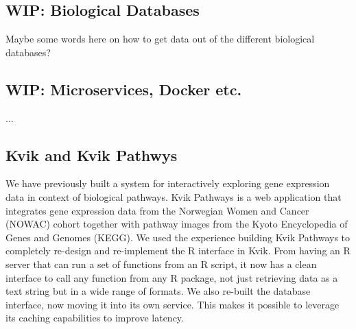 \subsection*{WIP: Biological Databases} 
Maybe some words here on how to get data out of the different biological
databases? 

\subsection*{WIP: Microservices, Docker etc.} 
... 

\subsection*{Kvik and Kvik Pathwys}
We have previously built a system for interactively exploring gene expression
data in context of  biological pathways.\cite{fjukstad2015kvik} Kvik Pathways is
a web application that integrates gene expression data from the Norwegian Women
and Cancer (NOWAC) cohort together with pathway images from the Kyoto
Encyclopedia of Genes and Genomes (KEGG). We used the experience building Kvik
Pathways to completely re-design and re-implement
the R interface in Kvik. From having an R server that can run a set of functions
from an R script, it now has a clean interface to call any function from any R
package, not just retrieving data as a text string but in a wide range of
formats. We also re-built the database interface, now moving it into its own
service. This makes it possible to leverage its caching capabilities to improve
latency. 

